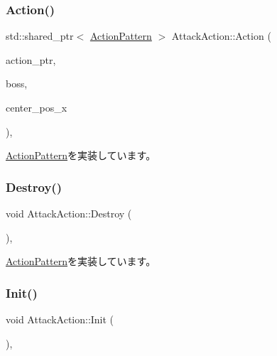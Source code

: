\subsubsection{\texorpdfstring{Action()}{Action()}}
{\footnotesize\ttfamily std\+::shared\+\_\+ptr$<$ \mbox{\hyperlink{class_action_pattern}{Action\+Pattern}} $>$ Attack\+Action\+::\+Action (\begin{DoxyParamCaption}\item[{std\+::shared\+\_\+ptr$<$ \mbox{\hyperlink{class_action_pattern}{Action\+Pattern}} $>$ \&}]{action\+\_\+ptr,  }\item[{\mbox{\hyperlink{class_boss}{Boss}} \&}]{boss,  }\item[{const float}]{center\+\_\+pos\+\_\+x }\end{DoxyParamCaption})\hspace{0.3cm}{\ttfamily [final]}, {\ttfamily [virtual]}}



\mbox{\hyperlink{class_action_pattern_a04c8daf0bf5e263303f7d86aec20eb27}{Action\+Pattern}}を実装しています。

\mbox{\label{class_attack_action_aa91f60f80fc0c76f321fbf2da3945c43}} 
\subsubsection{\texorpdfstring{Destroy()}{Destroy()}}
{\footnotesize\ttfamily void Attack\+Action\+::\+Destroy (\begin{DoxyParamCaption}{ }\end{DoxyParamCaption})\hspace{0.3cm}{\ttfamily [final]}, {\ttfamily [virtual]}}



\mbox{\hyperlink{class_action_pattern_a73833df08867c4f4785ddf51344eca47}{Action\+Pattern}}を実装しています。

\mbox{\label{class_attack_action_afd8d8c674040a1361c35d1703f36b30e}} 
\subsubsection{\texorpdfstring{Init()}{Init()}}
{\footnotesize\ttfamily void Attack\+Action\+::\+Init (\begin{DoxyParamCaption}{ }\end{DoxyParamCaption})\hspace{0.3cm}{\ttfamily [final]}, {\ttfamily [virtual]}}



